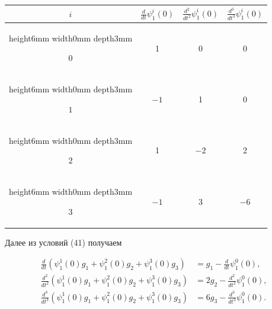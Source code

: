 \begin{exam}
\begin{center}
\begin{tabular}{|c|c|c|c|}


$ i $ & $\frac{d}{dt}\psi_1^i(0)$ &


$\frac{d^2}{dt^2}\psi_1^i(0)$ &


$\frac{d^3}{dt^3}\psi_1^i(0)$ \\


\hline


\hline \vrule height6mm width0mm depth3mm




$ 0 $ & 1 & 0 & 0 \\


\hline \vrule height6mm width0mm depth3mm




$ 1 $ & $-1$  & 1 &  0 \\


\hline \vrule height6mm width0mm depth3mm




$ 2 $ & 1 & $-2$  & 2 \\


\hline \vrule height6mm width0mm depth3mm




$ 3 $ & $-1$  & 3 & $-6$  \\


\hline


\end{tabular}


\end{center}





Далее из условий (41) получаем


\begin{align*}


\frac{d}{dt}(\psi_1^1(0)g_1+\psi_1^2(0)g_2+\psi_1^3(0)g_3)&=


g_1-\frac{d}{dt}\psi_1^0(0), \\


\frac{d^2}{dt^2}(\psi_1^1(0)g_1+\psi_1^2(0)g_2+\psi_1^3(0)g_3)&=


2g_2- \frac{d^2}{dt^2}\psi_1^0(0), \\


\frac{d^3}{dt^3}(\psi_1^1(0)g_1+\psi_1^2(0)g_2+\psi_1^3(0)g_3)&=


6g_3- \frac{d^3}{dt^3}\psi_1^0(0).


\end{align*}






\end{exam}
